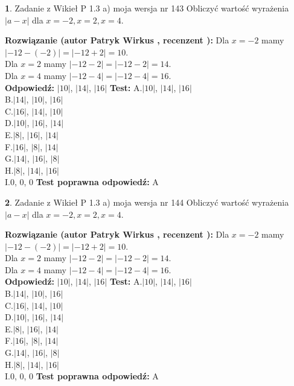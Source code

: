\documentclass[12pt, a4paper]{article}
\theoremstyle{definition} %
\newtheorem{zad}{}
\newcommand{\zadStart}[1]{\begin{zad}#1\newline}
\newcommand{\zadStop}{\end{zad}}
\newcommand{\rozwStart}[2]{\noindent \textbf{Rozwiązanie (autor #1 , recenzent #2): }\newline}
\newcommand{\rozwStop}{\newline}
\newcommand{\odpStart}{\noindent \textbf{Odpowiedź:}\newline}
\newcommand{\odpStop}{\newline}
\newcommand{\testStart}{\noindent \textbf{Test:}\newline}
\newcommand{\testStop}{\newline}
\newcommand{\kluczStart}{\noindent \textbf{Test poprawna odpowiedź:}\newline}
\newcommand{\kluczStop}{\newline}
\begin{document}
\zadStart{Zadanie z Wikieł P 1.3 a) moja wersja nr 143}
Obliczyć wartość wyrażenia $|a - x|$ dla $x=-2,x=2,x=4$.
\zadStop
\rozwStart{Patryk Wirkus}{}
Dla $x = -2$ mamy $|-12 - (-2)| = |-12 + 2| = 10$.\\
Dla $x = 2$ mamy $|-12 - 2| = |-12 - 2| = 14$.\\
Dla $x = 4$ mamy $|-12 - 4| = |-12 - 4| = 16$.\\
\rozwStop
\odpStart
$|10|$, $|14|$, $|16|$
\odpStop
\testStart
A.$|10|$, $|14|$, $|16|$\\
B.$|14|$, $|10|$, $|16|$\\
C.$|16|$, $|14|$, $|10|$\\
D.$|10|$, $|16|$, $|14|$\\
E.$|8|$, $|16|$, $|14|$\\
F.$|16|$, $|8|$, $|14|$\\
G.$|14|$, $|16|$, $|8|$\\
H.$|8|$, $|14|$, $|16|$\\
I.$0$, $0$, $0$
\testStop
\kluczStart
A
\kluczStop



\zadStart{Zadanie z Wikieł P 1.3 a) moja wersja nr 144}
Obliczyć wartość wyrażenia $|a - x|$ dla $x=-2,x=2,x=4$.
\zadStop
\rozwStart{Patryk Wirkus}{}
Dla $x = -2$ mamy $|-12 - (-2)| = |-12 + 2| = 10$.\\
Dla $x = 2$ mamy $|-12 - 2| = |-12 - 2| = 14$.\\
Dla $x = 4$ mamy $|-12 - 4| = |-12 - 4| = 16$.\\
\rozwStop
\odpStart
$|10|$, $|14|$, $|16|$
\odpStop
\testStart
A.$|10|$, $|14|$, $|16|$\\
B.$|14|$, $|10|$, $|16|$\\
C.$|16|$, $|14|$, $|10|$\\
D.$|10|$, $|16|$, $|14|$\\
E.$|8|$, $|16|$, $|14|$\\
F.$|16|$, $|8|$, $|14|$\\
G.$|14|$, $|16|$, $|8|$\\
H.$|8|$, $|14|$, $|16|$\\
I.$0$, $0$, $0$
\testStop
\kluczStart
A
\kluczStop
\end{document}
